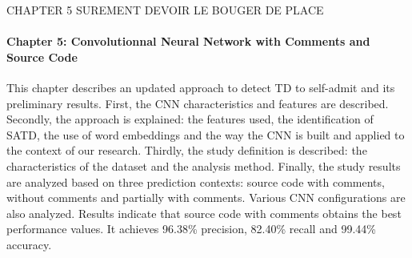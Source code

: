 CHAPTER 5 SUREMENT DEVOIR LE BOUGER DE PLACE
\paragraph{Chapter 5: Convolutionnal Neural Network with Comments and Source Code} This chapter describes an updated approach to detect \ac{TD} to self-admit and its preliminary results. First, the \ac{CNN} characteristics and features are described. Secondly, the approach is explained: the features used, the identification of \ac{SATD}, the use of word embeddings and the way the \ac{CNN} is built and applied to the context of our research. Thirdly, the study definition is described: the characteristics of the dataset and the analysis method. Finally, the study results are analyzed based on three prediction contexts: source code with comments, without comments and partially with comments. Various \ac{CNN} configurations are also analyzed. Results indicate that source code with comments obtains the best performance values. It achieves 96.38\% precision, 82.40\% recall and 99.44\% accuracy.









